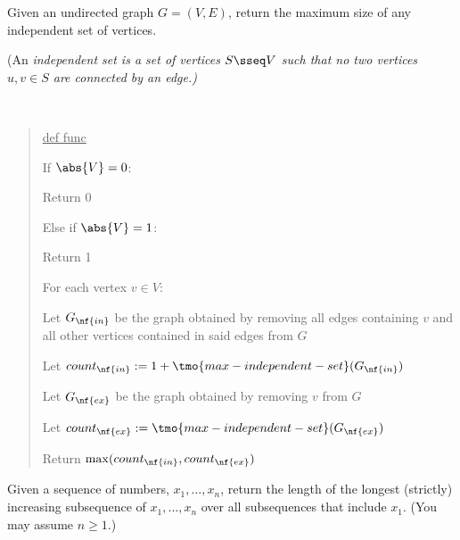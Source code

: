 \documentclass[10pt]{article}
\begin{document}
Given an undirected graph \( G = (V, E) \), return the maximum size of any independent set of vertices.

(An \it{independent set} is a set of vertices \( S\sseq V \) such that no two vertices \( u,v\in S \) are connected by an edge.)

\begin{solution}\ %
\begin{quote}%
  \noindent\ul{def func }%


  \begin{steps}
    \item If \( \abs{V} = 0 \):
      \begin{steps}
      \item Return 0
      \end{steps}
    \item Else if \( \abs{V} = 1 \):
      \begin{steps}
      \item Return 1
      \end{steps}
    \item For each vertex \( v \in V \):
      \begin{steps}
      \item Let \( G_{\nf{in}} \) be the graph obtained by removing all edges containing \( v \) and all other vertices contained in said edges from \( G \)
      \item Let \( count_{\nf{in}} := 1+\tmo{max-independent-set}(G_{\nf{in}}) \) 
      \item Let \( G_{\nf{ex}} \) be the graph obtained by removing \( v \) from \( G \)
      \item Let \( count_{\nf{ex}} := \tmo{max-independent-set}(G_{\nf{ex}}) \) 
      \item Return \( \max(count_{\nf{in}}, count_{\nf{ex}}) \)
      \end{steps}
  \end{steps}
\end{quote}%
\end{solution}%
\pagebreak

Given a sequence of numbers, \( x_1, \ldots, x_n \), return the length of the longest (strictly) increasing subsequence of \( x_1, \ldots, x_n \) over all subsequences that include \( x_1 \). (You may assume \( n \geq 1 \).)
\end{document}
